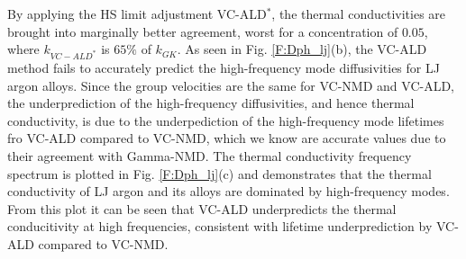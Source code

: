 \documentclass[aps,prb,onecolumn,preprint,footinbib,superscriptaddress,amsmath,amssymb,floatfix]{revtex4}
\newcommand{\kw}{\mspace{-4.0mu}\left(\mspace{-8.0mu}
\begin{smallmatrix}&\pmb{\kappa} \\&\omega\end{smallmatrix}
\mspace{-3.0mu}\right)}
\begin{document}
By applying the HS limit adjustment VC-ALD$^*$, the thermal 
conductivities are brought into marginally 
better agreement, worst for a concentration of $0.05$, where 
$k_{VC-ALD^*}$ is $65\%$ of $ k_{GK}$.  
As seen in Fig. \ref{F:Dph_lj}(b), the VC-ALD method fails to 
accurately predict the high-frequency mode diffusivities for 
LJ argon alloys. 
Since the group velocities are the same for VC-NMD and VC-ALD, 
the underprediction of the high-frequency diffusivities, and 
hence thermal conductivity, is 
due to the underpediction of the high-frequency 
mode lifetimes fro VC-ALD compared to VC-NMD, which we know are 
accurate values due to their agreement with Gamma-NMD. The thermal 
conductivity frequency spectrum is plotted in 
Fig. \ref{F:Dph_lj}(c) and demonstrates that the thermal conductivity 
of LJ argon and its alloys are dominated by high-frequency modes. 
From this plot it can be seen that VC-ALD underpredicts the thermal 
conducitivity at high frequencies, consistent with lifetime 
underprediction by VC-ALD compared to VC-NMD. 


\end{document}
